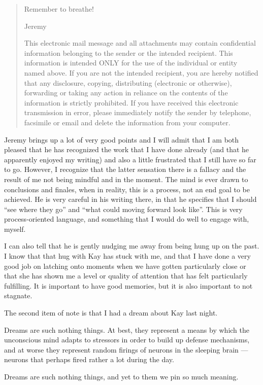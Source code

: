 \begin{quote}
Remember to breathe!

Jeremy

This electronic mail message and all attachments may contain confidential information belonging to the sender or the intended recipient. This information is intended ONLY for the use of the individual or entity named above. If you are not the intended recipient, you are hereby notified that any disclosure, copying, distributing (electronic or otherwise), forwarding or taking any action in reliance on the contents of the information is strictly prohibited. If you have received this electronic transmission in error, please immediately notify the sender by telephone, facsimile or email and delete the information from your computer.
\end{quote}

Jeremy brings up a lot of very good points and I will admit that I am both pleased that he has recognized the work that I have done already (and that he apparently enjoyed my writing) and also a little frustrated that I still have so far to go. However, I recognize that the latter sensation there is a fallacy and the result of me not being mindful and in the moment. The mind is ever drawn to conclusions and finales, when in reality, this is a process, not an end goal to be achieved. He is very careful in his writing there, in that he specifies that I should ``see where they go'' and ``what could moving forward look like''. This is very process-oriented language, and something that I would do well to engage with, myself.

I can also tell that he is gently nudging me away from being hung up on the past. I know that that hug with Kay has stuck with me, and that I have done a very good job on latching onto moments when we have gotten particularly close or that she has shown me a level or quality of attention that has felt particularly fulfilling. It is important to have good memories, but it is also important to not stagnate.

The second item of note is that I had a dream about Kay last night.

Dreams are such nothing things. At best, they represent a means by which the unconscious mind adapts to stressors in order to build up defense mechanisms, and at worse they represent random firings of neurons in the sleeping brain --- neurons that perhaps fired rather a lot during the day.

Dreams are such nothing things, and yet to them we pin so much meaning.

